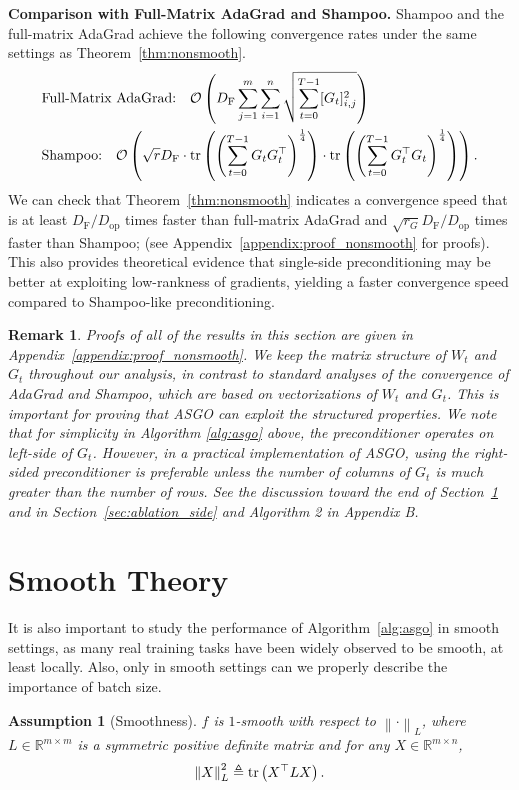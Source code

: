 \documentclass{article}
\newtheorem{remark}{Remark}
\newtheorem{assumption}{Assumption}
\theoremstyle{remark}
\newcommand{\Norm}[1]{\left\|#1\right\|}
\newcommand{\tr}[1]{{\rm tr}\left( #1 \right)}
\newcommand{\cO}{\mathcal{O}}
\newcommand{\RR}{\mathbb{R}}
\begin{document}
\textbf{Comparison with Full-Matrix AdaGrad and Shampoo.} Shampoo
and the full-matrix AdaGrad
achieve the following convergence rates under the same settings as Theorem~\ref{thm:nonsmooth}.
    \begin{align*}
    &\text{Full-Matrix AdaGrad:} \quad \cO\left( D_{\mathrm{F}} \sum_{j=1}^{m} \sum_{i=1}^n \sqrt{\sum_{t=0}^{T-1} [G_{t}]_{i,j}^2} \right) \\
    &\text{Shampoo:} \quad \cO\left( \sqrt{r} D_{\mathrm{F}} \cdot \tr{\left( \sum_{t=0}^{T-1} G_t G_t^\top \right)^{\frac{1}{4}}} \cdot \tr{\left( \sum_{t=0}^{T-1} G_t^{\top} G_t \right)^{\frac{1}{4}}} \right) .
    \end{align*}
    We can check that Theorem~\ref{thm:nonsmooth} indicates a convergence speed that is at least $D_{\mathrm{F}}/D_{\mathrm{op}}$ times faster than full-matrix AdaGrad and $\sqrt{r_G} D_{\mathrm{F}}/D_{\mathrm{op}}$ times faster than Shampoo; (see Appendix~\ref{appendix:proof_nonsmooth} for proofs). This also provides theoretical evidence that single-side preconditioning may be better at exploiting low-rankness of gradients, yielding a faster convergence speed compared to Shampoo-like preconditioning.

\begin{remark}
    { Proofs of all of the results in this section are given in Appendix~\ref{appendix:proof_nonsmooth}. We keep the matrix structure of $W_t$ and $G_t$ throughout our analysis, in contrast to standard analyses of the convergence of AdaGrad and Shampoo, which are based on vectorizations of $W_t$ and $G_t$. This is important for proving that ASGO can exploit the structured properties.
    We note that for simplicity in Algorithm \ref{alg:asgo} above, the preconditioner operates on left-side of $G_t$. However, in a practical implementation of ASGO,
    using the right-sided preconditioner is preferable unless the number of columns of $G_t$ is much greater than the number of rows. See the discussion toward the end of Section~\ref{sec:smooth} and in Section~\ref{sec:ablation_side} and Algorithm 2 in Appendix B.
    }

    

\end{remark}

\section{Smooth Theory}\label{sec:smooth}
It is also important to study the performance of Algorithm~\ref{alg:asgo} in smooth settings, as many real training tasks have been widely observed to be smooth, at least locally. Also, only in smooth settings can we properly describe the importance of batch size.
\begin{assumption}[Smoothness]\label{asm:smooth_block}
    $f$ is $1$-smooth with respect to $\Norm{\cdot}_L$, where $L \in \RR^{m\times m}$ is a symmetric positive definite matrix and for any $X \in \RR^{m\times n}$,
    \begin{align*}
        \Norm{X}_L^2 \triangleq \tr{X^\top L X} .
    \end{align*}
\end{assumption}
\end{document}
